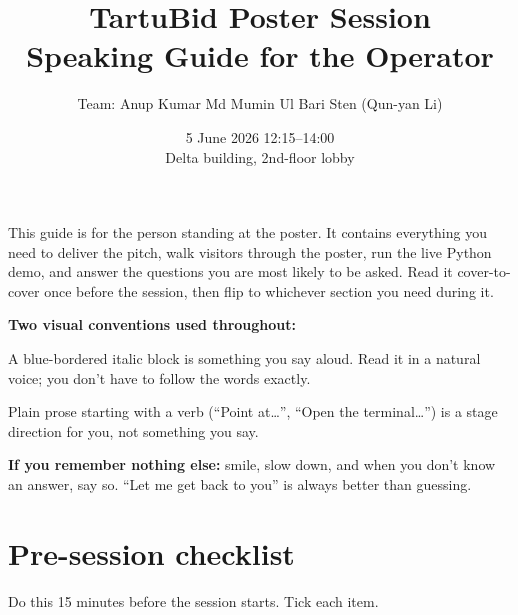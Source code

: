 \documentclass[a4paper,11pt]{article}
\title{TartuBid Poster Session\\\large Speaking Guide for the Operator}
\author{Team: Anup Kumar \textbullet{} Md Mumin Ul Bari \textbullet{} Sten (Qun-yan Li)}
\date{5 June 2026 \textbullet{} 12:15--14:00\\Delta building, 2nd-floor lobby}
\begin{document}
\maketitle
\thispagestyle{fancy}

\noindent
This guide is for the person standing at the poster. It contains
everything you need to deliver the pitch, walk visitors through the
poster, run the live Python demo, and answer the questions you are
most likely to be asked. Read it cover-to-cover once before the
session, then flip to whichever section you need during it.

\medskip
\noindent
\textbf{Two visual conventions used throughout:}

\begin{spoken}
A blue-bordered italic block is something you say aloud. Read it
in a natural voice; you don't have to follow the words exactly.
\end{spoken}

\noindent
Plain prose starting with a verb (``Point at\ldots'', ``Open the
terminal\ldots'') is a stage direction for you, not something you
say.

\medskip
\noindent
\textbf{If you remember nothing else:} smile, slow down, and when
you don't know an answer, say so. ``Let me get back to you'' is
always better than guessing.

\vspace{1em}
\tableofcontents
\newpage

\section{Pre-session checklist}

Do this 15 minutes before the session starts. Tick each item.
\end{document}
